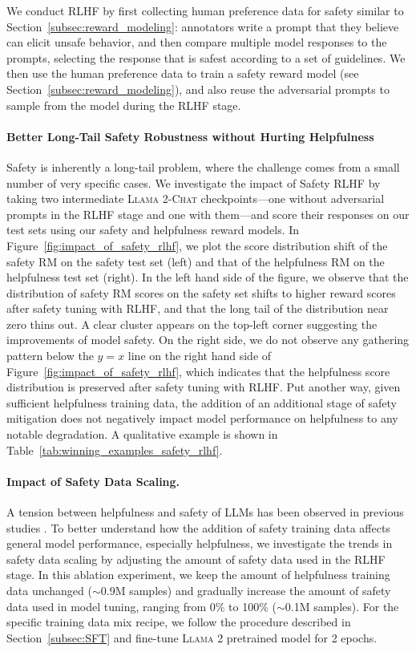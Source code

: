 We conduct RLHF by first collecting human preference data for safety similar to Section~\ref{subsec:reward_modeling}: annotators write a prompt that they believe can elicit unsafe behavior, and then compare multiple model responses to the prompts, selecting the response that is safest according to a set of guidelines. We then use the human preference data to train a safety reward model (see Section~\ref{subsec:reward_modeling}), and also reuse the adversarial prompts to sample from the model during the RLHF stage.

\paragraph{Better Long-Tail Safety Robustness without Hurting Helpfulness} Safety is inherently a long-tail problem, where the challenge comes from a small number of very specific cases. We investigate the impact of Safety RLHF by taking two intermediate \textsc{Llama 2-Chat} checkpoints---one without adversarial prompts in the RLHF stage and one with them---and score their responses on our test sets using our safety and helpfulness reward models. In Figure~\ref{fig:impact_of_safety_rlhf}, we plot the score distribution shift of the safety RM on the safety test set (left) and that of the helpfulness RM on the helpfulness test set (right). In the left hand side of the figure, we observe that the distribution of safety RM scores on the safety set shifts to higher reward scores after safety tuning with RLHF, and that the long tail of the distribution near zero thins out. A clear cluster appears on the top-left corner suggesting the improvements of model safety. On the right side, we do not observe any gathering pattern below the $y=x$ line on the right hand side of Figure~\ref{fig:impact_of_safety_rlhf}, which indicates that the helpfulness score distribution is preserved after safety tuning with RLHF. Put another way, given sufficient helpfulness training data, the addition of an additional stage of safety mitigation does not negatively impact model performance on helpfulness to any notable degradation. A qualitative example is shown in Table~\ref{tab:winning_examples_safety_rlhf}. 

\paragraph{Impact of Safety Data Scaling.}

A tension between helpfulness and safety of LLMs has been observed in previous studies \citep{bai2022training}. To better understand how the addition of safety training data affects general model performance, especially helpfulness, we investigate the trends in safety data scaling by adjusting the amount of safety data used in the RLHF stage. In this ablation experiment, we keep the amount of helpfulness training data unchanged ($\sim$0.9M samples) and gradually increase the amount of safety data used in model tuning, ranging from 0\% to 100\% ($\sim$0.1M samples). For the specific training data mix recipe, we follow the procedure described in Section~\ref{subsec:SFT} and fine-tune \textsc{Llama 2} pretrained model for 2 epochs. 

